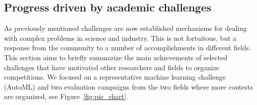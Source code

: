 \documentclass[twoside,11pt]{article}
\begin{document}
\subsection{Progress driven by academic challenges}
As previously mentioned challenges are now established mechanisms for dealing with complex problems in science and industry. This is not fortuitous, but a response from the community to a number of accomplishments in different fields. This section aims to briefly summarize the main achievements of selected challenges that have motivated other researchers and fields to organize competitions. We focused on a representative machine learning challenge (AutoML) and two evaluation campaigns from the two fields where more contests are organized, see Figure~\ref{fig:pie_chart}.

\begin{itemize}


\end{itemize}
\end{document}

